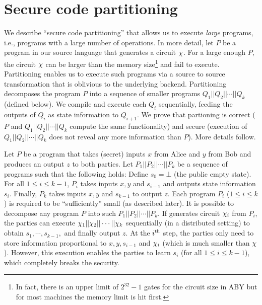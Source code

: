 \section{Secure code partitioning}
\label{sec:pipe}

We  describe ``secure code partitioning'' that allows us to execute {\it large} programs, i.e., programs with a large number of operations.
In more detail, let $P$ be a program in our source language that generates a circuit $\chi$. For a large enough $P$, the circuit $\chi$  can be larger than the memory size\footnote{In fact, there is an upper limit of $2^{32}-1$ gates for the circuit size in ABY but for most machines the memory limit is hit first.} and fail to execute. Partitioning enables us to
execute such programs via a source to source transformation that is oblivious to the underlying \mpc backend. Partitioning decomposes the program $P$ into a sequence of smaller \tool programs $Q_1||Q_2||\cdots||Q_k$ (defined below). We compile and execute each $Q_i$ sequentially, feeding the outputs of $Q_i$ as state information to $Q_{i+1}$. We prove that partioning is correct ($P$ and $Q_1||Q_2||\cdots||Q_k$ compute the same functionality) and secure (execution of $Q_1||Q_2||\cdots||Q_k$ does not reveal any more information than $P$). More details follow.


Let $P$ be a program that takes (secret) inputs $x$ from Alice and $y$ from Bob and produces an output $z$ to both parties. Let $P_1||P_2||\cdots||P_k$ be a sequence of programs such that the following holds: Define $s_0 = \bot$ (the public empty state). For all $1\leq i\leq k-1$, $P_i$ takes inputs $x, y$ and $s_{i-1}$ and outputs  state information $s_i$. Finally, $P_k$ takes inputs $x,y$ and $s_{k-1}$ to  output $z$. Each program $P_i$ ($1\leq i\leq k$) is required to be ``sufficiently'' small (as described later). It is possible to decompose any program $P$  into such $P_1||P_2||\cdots||P_k$. If \tool generates circuit $\chi_i$ from $P_i$, the parties can execute $\chi_1||\chi_2||\cdots||\chi_k$ sequentially (in a distributed setting)  to obtain $s_1,\cdots,s_{k-1},$ and finally output $z$. At the $i^{\textrm{\tiny{th}}}$ step, the parties only need to store information proportional to $x,y,s_{i-1}$ and $\chi_i$ (which is much smaller than $\chi$). However, this execution enables the parties to learn $s_i$ (for all $1\leq i\leq k-1$), which completely breaks the security.

